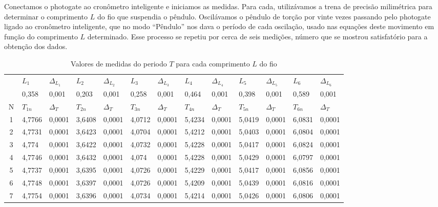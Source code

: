 \documentclass[a4paper]{article}
\begin{document}
Conectamos o photogate ao cronômetro inteligente e iniciamos as medidas. Para cada, utilizávamos a trena de precisão milimétrica para determinar o comprimento $L$ do fio que suspendia o pêndulo. Oscilávamos o pêndulo de torção por vinte vezes passando pelo photogate ligado ao cronômetro inteligente, que no modo “Pêndulo” nos dava o período de cada oscilação, usado nas equações deste movimento em função do comprimento $L$ determinado. Esse processo se repetiu por cerca de seis medições, número que se mostrou satisfatório para a obtenção dos dados.

\begin{table}[!htbp]
\centering
	    \caption{Valores de medidas do periodo $T$ para cada comprimento $L$ do fio}
	    \begin{tabular}{|c|l|l|l|l|l|l|l|l|l|l|l|l|}
	    \hline
	     ~	 &	 $L_1$    & $\Delta_{L_1}$  & $L_2$     & $\Delta_{L_2}$  & $L_3$     & $\Delta_{L_3}$  & $L_4$     & $\Delta_{L_4}$  & $L_5$     & $\Delta_{L_5}$  & $L_6$     & $\Delta_{L_6}$  \\ \\cline{2-13}
	    ~	&	0,358  & 0,001  & 0,203  & 0,001  & 0,258  & 0,001  & 0,464  & 0,001  & 0,398  & 0,001  & 0,589  & 0,001  \\ \hline
	    N	&	$T_{1n}$      & $\Delta_T$   & $T_{2n}$      & $\Delta_T$   & $T_{3n}$      & $\Delta_T$   & $T_{4n}$      & $\Delta_T$   & $T_{5n}$      & $\Delta_T$   & $T_{6n}$      & $\Delta_T$   \\ \hline
		1	&	4,7766 & 0,0001 & 3,6408 & 0,0001 & 4,0712 & 0,0001 & 5,4234 & 0,0001 & 5,0419 & 0,0001 & 6,0831 & 0,0001 \\ \hline
		2	&	4,7731 & 0,0001 & 3,6423 & 0,0001 & 4,0704 & 0,0001 & 5,4212 & 0,0001 & 5,0403 & 0,0001 & 6,0804 & 0,0001 \\ \hline
		3	&	4,774  & 0,0001 & 3,6422 & 0,0001 & 4,0732 & 0,0001 & 5,4228 & 0,0001 & 5,0417 & 0,0001 & 6,0824 & 0,0001 \\ \hline
 		4	&	4,7746 & 0,0001 & 3,6432 & 0,0001 & 4,074  & 0,0001 & 5,4228 & 0,0001 & 5,0429 & 0,0001 & 6,0797 & 0,0001 \\ \hline
  		5	&	4,7737 & 0,0001 & 3,6395 & 0,0001 & 4,0726 & 0,0001 & 5,4229 & 0,0001 & 5,0417 & 0,0001 & 6,0856 & 0,0001 \\ \hline
 		6	&	4,7748 & 0,0001 & 3,6397 & 0,0001 & 4,0726 & 0,0001 & 5,4209 & 0,0001 & 5,0439 & 0,0001 & 6,0816 & 0,0001 \\ \hline
   		7	&	4,7754 & 0,0001 & 3,6396 & 0,0001 & 4,0734 & 0,0001 & 5,4214 & 0,0001 & 5,0426 & 0,0001 & 6,0806 & 0,0001 \\ \hline

\end{tabular}
\end{table}
\end{document}
